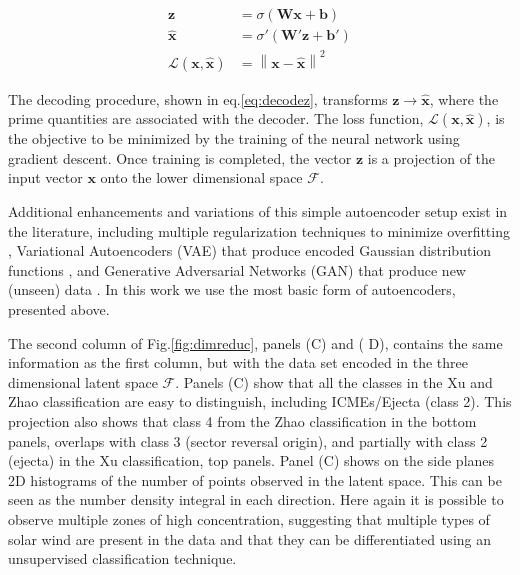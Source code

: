 \begin{align}
\boldsymbol{z} & = \sigma \left( \boldsymbol{W}\boldsymbol{x} + \boldsymbol{b} \right) \label{eq:encodex} \\
\boldsymbol{\hat{x}} & = \sigma' \left( \boldsymbol{W'}\boldsymbol{z} + \boldsymbol{b'} \right) \label{eq:decodez} \\ 
\mathcal{L}(\boldsymbol{x}, \boldsymbol{\hat{x}}) & =  \left\lVert \boldsymbol{x}- \boldsymbol{\hat{x}} \right\rVert^2 \label{eq:aeloss}
\end{align}

The decoding procedure, shown in eq.\eqref{eq:decodez}, transforms $\boldsymbol{z}\rightarrow\boldsymbol{\hat{x}}$, where the prime quantities are associated with the decoder. The loss function, $\mathcal{L}(\boldsymbol{x}, \boldsymbol{\hat{x}})$, is the objective to be minimized by the training of the neural network using gradient descent. Once training is completed, the vector $\boldsymbol{z}$ is a projection of the input vector $\boldsymbol{x}$ onto the lower dimensional space $\boldsymbol{\mathcal{F}}$.

Additional enhancements and variations of this simple autoencoder setup exist in the literature, including multiple regularization techniques to minimize overfitting \citep{7407967}, Variational Autoencoders (VAE) that produce encoded Gaussian distribution functions \citep{Kingma2013}, and Generative Adversarial Networks (GAN) that produce new (unseen) data \citep{Goodfellow2014}. In this work we use the most basic form of autoencoders, presented above.

The second column of Fig.\ref{fig:dimreduc}, panels (C) and (
D), contains the same information as the first column, but with the data set encoded in the three dimensional latent space $\boldsymbol{\mathcal{F}}$. Panels (C) show that all the classes in the Xu and Zhao classification are easy to distinguish, including ICMEs/Ejecta (class 2). This projection also shows that class 4 from the Zhao classification in the bottom panels, overlaps with class 3 (sector reversal origin), and partially with class 2 (ejecta) in the Xu classification, top panels. Panel (C) shows on the side planes 2D histograms of the number of points observed in the latent space. This can be seen as the number density integral in each direction. Here again it is possible to observe multiple zones of high concentration, suggesting that multiple types of solar wind are present in the data and that they can be differentiated using an unsupervised classification technique. 

